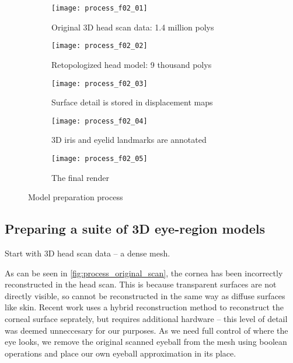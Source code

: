 \begin{figure*}
    \centering
    \begin{subfigure}[t]{0.195\textwidth}
        \texttt{[image: process\_f02\_01]}
        \caption{Original 3D head scan data: 1.4 million polys}
        \label{fig:process_original_scan}
    \end{subfigure}
    \hfill
    \begin{subfigure}[t]{0.195\textwidth}
        \texttt{[image: process\_f02\_02]}
        \caption{Retopologized head model: 9 thousand polys}
        \label{fig:process_retopo}
    \end{subfigure}
    \hfill
    \begin{subfigure}[t]{0.195\textwidth}
        \texttt{[image: process\_f02\_03]}
        \caption{Surface detail is stored in displacement maps}
        \label{fig:process_displaced_subdiv}
    \end{subfigure}
    \hfill
    \begin{subfigure}[t]{0.195\textwidth}
        \texttt{[image: process\_f02\_04]}
        \caption{3D iris and eyelid landmarks are annotated}
    \end{subfigure}
    \hfill
    \begin{subfigure}[t]{0.195\textwidth}
        \texttt{[image: process\_f02\_05]}
        \caption{The final render}
    \end{subfigure}
    \caption{Model preparation process}
    \label{fig:process}
\end{figure*}

\subsection{Preparing a suite of 3D eye-region models}

Start with 3D head scan data -- a dense mesh.

As can be seen in \autoref{fig:process_original_scan}, the cornea has been incorrectly reconstructed in the head scan. This is because transparent surfaces are not directly visible, so cannot be reconstructed in the same way as diffuse surfaces like skin. Recent work uses a hybrid reconstruction method to reconstruct the corneal surface seprately, but requires additional hardware \cite{berard2014highquality} -- this level of detail was deemed unneccesary for our purposes. As we need full control of where the eye looks, we remove the original scanned eyeball from the mesh using boolean operations and place our own eyeball approximation in its place.

